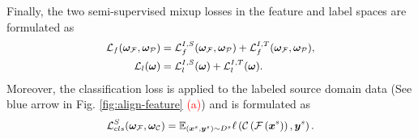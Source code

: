 \documentclass[10pt,twocolumn,letterpaper, ]{article}
\begin{document}
Finally, the two semi-supervised mixup losses in the feature and label spaces are formulated as
{\setlength\abovedisplayskip{3pt}
\setlength\belowdisplayskip{3pt}
\begin{equation}
\small
    \begin{aligned}
 \mathcal{L}_{f}(\boldsymbol{\omega}_{\mathcal{F}}, \boldsymbol{\omega}_{\mathcal{P}}) &= \mathcal{L}_{f}^{I,S}(\boldsymbol{\omega}_{\mathcal{F}}, \boldsymbol{\omega}_{{\mathcal{P}}}) + \mathcal{L}_{f}^{I,T}(\boldsymbol{\omega}_{\mathcal{F}}, \boldsymbol{\omega}_{\mathcal{P}}),\\
\mathcal{L}_{l}(\boldsymbol{\omega}) &= \mathcal{L}_{l}^{I,S}(\boldsymbol{\omega}) + \mathcal{L}_{l}^{I,T}(\boldsymbol{\omega}). \nonumber
    \end{aligned}
\end{equation}}
Moreover, the classification loss is applied to the labeled source domain data (See \textcolor{blue_light}{blue arrow} in Fig. \ref{fig:align-feature} \textcolor{red}{(a)}) and is formulated as 
{\setlength\abovedisplayskip{3pt}
\setlength\belowdisplayskip{3pt}
\begin{equation}
\small
    \begin{aligned}
\mathcal{L}_{cls}^{S}(\boldsymbol{\omega}_{\mathcal{F}}, \boldsymbol{\omega}_{\mathcal{C}})=\mathbb{E}_{\left(\boldsymbol{x}^{s}, \boldsymbol{y}^{s}\right) \sim D^{s}} \ell\left(\mathcal{C}\left(\mathcal{F}\left(\boldsymbol{x}^{s}\right)\right), \boldsymbol{y}^{s}\right).\nonumber
    \end{aligned}
\end{equation}}
\end{document}
